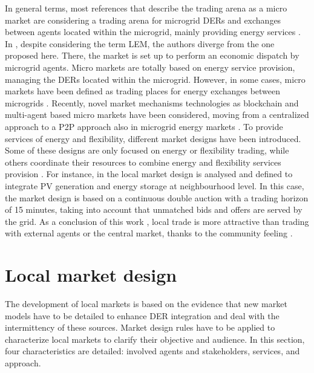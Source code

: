 In general terms, most references that describe the trading arena as a micro market are considering a trading arena for microgrid DERs and exchanges between agents located within the microgrid, mainly providing energy services \cite{faber2014micro, lane2013costing, block2008market, cox2011energy, sikdar2013microgrid, cui2014electricity, densmore2015energy, Heidari2018}. In \cite{shamsi2015economic}, despite considering the term LEM, the authors diverge from the one proposed here. There, the market is set up to perform an economic dispatch by microgrid agents. Micro markets are totally based on energy service provision, managing the DERs located within the microgrid. However, in some cases, micro markets have been defined as trading places for energy exchanges between microgrids \cite{menniti2014future}. Recently, novel market mechanisms technologies as blockchain and multi-agent based micro markets have been considered, moving from a centralized approach to a P2P approach also in microgrid energy markets \cite{Kounelis2017Fostering}. To provide services of energy and flexibility, different market designs have been introduced. Some of these designs are only focused on energy or flexibility trading, while others coordinate their resources to combine energy and flexibility services provision \cite{vytelingum2010trading, sikdar2013microgrid, Bayram2014}. For instance, in \cite{ampatzis2014local} the local market design is analysed and defined to integrate PV generation and energy storage at neighbourhood level. In this case, the market design is based on a continuous double auction with a trading horizon of 15 minutes, taking into account that unmatched bids and offers are served by the grid. As a conclusion of this work \cite{ampatzis2014local}, local trade is more attractive than trading with external agents or the central market, thanks to the community feeling \cite{Pinson2017}. 

\section{Local market design} \label{sec:design}
The development of local markets is based on the evidence that new market models have to be detailed to enhance DER integration and deal with the intermittency of these sources. Market design rules have to be applied to characterize local markets to clarify their objective and audience. In this section, four characteristics are detailed: involved agents and stakeholders, services, and approach.

